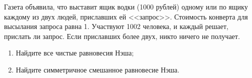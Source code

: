 








\begin{problem}
\begin{source}
\cite{savva:nmu}
\end{source}
Газета объявила, что выставит ящик водки (1000 рублей) одному или по ящику каждому из двух людей, приславших ей <<запрос>>. Стоимость конверта для высылания запроса равна 1. Участвуют 1002 человека, и каждый решает, прислать ли запрос. Если приславших более двух, никто ничего не получает.
\begin{enumerate}
\item Найдите все чистые равновесия Нэша;
\item  Найдите симметричное смешанное равновесие Нэша.
\end{enumerate}


\begin{sol}

\end{sol}
\end{problem}


